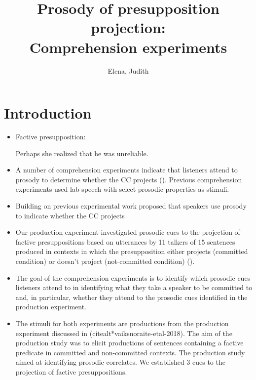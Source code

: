 \documentclass[dina4,12pt,fleqn]{article}
\title{Prosody of presupposition projection: \\ Comprehension experiments}
\author{Elena, Judith}
\newcommand{\6}{\mbox{$[\hspace*{-.6mm}[$}}
\newcommand{\9}{\mbox{$]\hspace*{-.6mm}]$}}
\begin{document}
\maketitle

\section{Introduction}

\begin{itemize}[leftmargin=12pt]

\item Factive presupposition:

\begin{exe}
\ex\label{ex} Perhaps she realized that he was unreliable.
\end{exe}


\item A number of comprehension experiments indicate that listeners attend to prosody to determine whether the CC projects (\citealt*{cummins-rohde-2015, tonhauser-2016}). Previous comprehension experiments used lab speech with select prosodic
properties as stimuli.

\item Building on previous experimental work proposed that speakers use prosody to indicate whether the CC projects

\item Our production experiment investigated prosodic cues to the projection of factive presuppositions based on utterances by 11 talkers of 15 sentences produced in contexts in which the presupposition either projects (committed condition) or doesn't project (not-committed condition) (\citealt*{vaiksnoraite-etal-2018}).

\item The goal of the comprehension experiments is to identify which prosodic cues listeners attend to in identifying what they take a speaker to be committed to and, in particular, whether they attend to the prosodic cues identified in the production experiment.

\item The stimuli for both experiments are productions from the production experiment discussed in (citealt*{vaiksnoraite-etal-2018}).  The aim of the production study was to elicit productions of sentences containing a factive predicate in committed and non-committed contexts. The production study aimed at identifying prosodic correlates. We established 3 cues to the projection of factive presuppositions.


\end{itemize}
\end{document}
